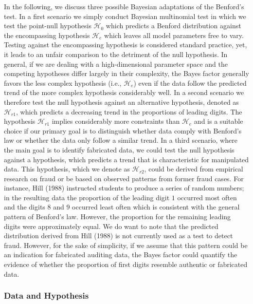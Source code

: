 \documentclass[
  english,
  man,floatsintext]{apa6}
\begin{document}
In the following, we discuss three possible Bayesian adaptations of the Benford's test. In a first scenario we simply conduct Bayesian multinomial test in which we test the point-null hypothesis \(\mathcal{H}_0\) which predicts a Benford distribution against the encompassing hypothesis \(\mathcal{H}_{e}\) which leaves all model parameters free to vary. Testing against the encompassing hypothesis is considered standard practice, yet, it leads to an unfair comparison to the detriment of the null hypothesis. In general, if we are dealing with a high-dimensional parameter space and the competing hypotheses differ largely in their complexity, the Bayes factor generally favors the less complex hypothesis (i.e., \(\mathcal{H}_{e}\)) even if the data follow the predicted trend of the more complex hypothesis considerably well. In a second scenario we therefore test the null hypothesis against an alternative hypothesis, denoted as \(\mathcal{H}_{r1}\), which predicts a decreasing trend in the proportions of leading digits. The hypothesis \(\mathcal{H}_{r1}\) implies considerably more constraints than \(\mathcal{H}_{e}\) and is a suitable choice if our primary goal is to distinguish whether data comply with Benford's law or whether the data only follow a similar trend. In a third scenario, where the main goal is to identify fabricated data, we could test the null hypothesis against a hypothesis, which predicts a trend that is characteristic for manipulated data. This hypothesis, which we denote as \(\mathcal{H}_{r2}\), could be derived from empirical research on fraud or be based on observed patterns from former fraud cases. For instance, Hill (1988) instructed students to produce a series of random numbers; in the resulting data the proportion of the leading digit \(1\) occurred most often and the digits \(8\) and \(9\) occurred least often which is consistent with the general pattern of Benford's law. However, the proportion for the remaining leading digits were approximately equal. We do want to note that the predicted distribution derived from Hill (1988) is not currently used as a test to detect fraud. However, for the sake of simplicity, if we assume that this pattern could be an indication for fabricated auditing data, the Bayes factor could quantify the evidence of whether the proportion of first digits resemble authentic or fabricated data.

\hypertarget{data-and-hypothesis}{%
\subsubsection{Data and Hypothesis}\label{data-and-hypothesis}}
\end{document}
